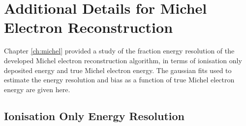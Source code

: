 \chapter{Additional Details for Michel Electron Reconstruction}\label{ch:energyfits}

\minitoc

Chapter \ref{ch:michel} provided a study of the fraction energy resolution of
the developed Michel electron reconstruction algorithm, in terms of ionisation
only deposited energy and true Michel electron energy. The gaussian fits used to
estimate the energy resolution and bias as a function of true Michel electron 
energy are given here.

\section{Ionisation Only Energy Resolution}

